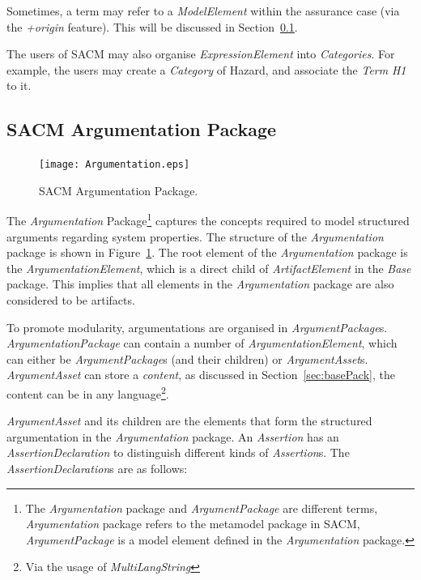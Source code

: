 Sometimes, a term may refer to a \textit{ModelElement} within the assurance case (via the \textit{+origin} feature). 
This will be discussed in Section~\ref{sec:argPack}.

The users of SACM may also organise \textit{ExpressionElement} into \textit{Categories}. 
For example, the users may create a \textit{Category} of Hazard, and associate the \textit{Term} \textit{H1} to it. 

\subsection{SACM Argumentation Package}
\label{sec:argPack}
\begin{figure}
	\centering
	\texttt{[image: Argumentation.eps]}
	\caption{SACM Argumentation Package.}
	\label{fig:arg}
\end{figure}
The \textit{Argumentation} Package\footnote{The \textit{Argumentation} package and \textit{ArgumentPackage} are different terms, \textit{Argumentation} package refers to the metamodel package in SACM, \textit{ArgumentPackage} is a model element defined in the \textit{Argumentation} package.} captures the concepts required to model structured arguments regarding system properties. 
The structure of the \textit{Argumentation} package is shown in Figure~\ref{fig:arg}.
The root element of the \textit{Argumentation} package is the \textit{ArgumentationElement}, which is a direct child of \textit{ArtifactElement} in the \textit{Base} package. 
This implies that all elements in the \textit{Argumentation} package are also considered to be artifacts. 

To promote modularity, argumentations are organised in \textit{ArgumentPackage}s. 
\textit{ArgumentationPackage} can contain a number of \textit{ArgumentationElement}, which can either be \textit{ArgumentPackage}s (and their children) or \textit{ArgumentAsset}s. 
\textit{ArgumentAsset} can store a \textit{content}, as discussed in Section~\ref{sec:basePack}, the content can be in any language\footnote{Via the usage of \textit{MultiLangString}}.

\textit{ArgumentAsset} and its children are the elements that form the structured argumentation in the \textit{Argumentation} package. 
An \textit{Assertion} has an \textit{AssertionDeclaration} to distinguish different kinds of \textit{Assertion}s. 
The \textit{AssertionDeclaration}s are as follows: 

